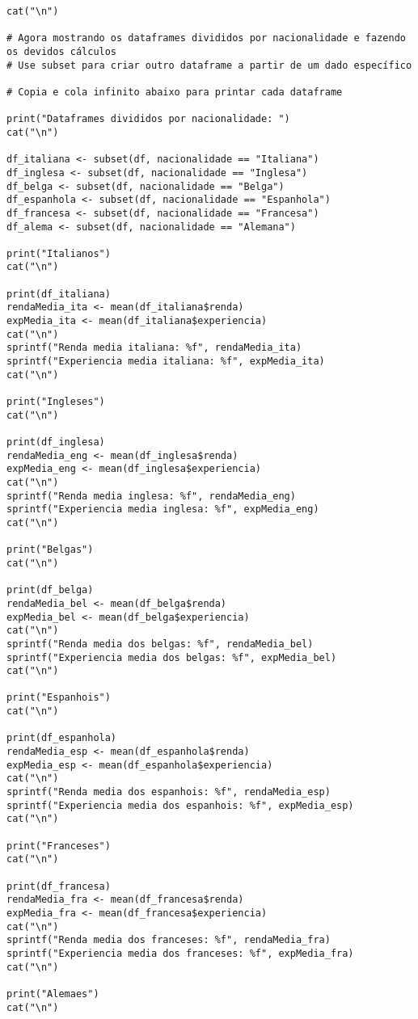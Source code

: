 \documentclass[a4paper,11pt]{article}
\begin{document}
\begin{lstlisting}
cat("\n")

# Agora mostrando os dataframes divididos por nacionalidade e fazendo os devidos cálculos
# Use subset para criar outro dataframe a partir de um dado específico

# Copia e cola infinito abaixo para printar cada dataframe

print("Dataframes divididos por nacionalidade: ")
cat("\n")

df_italiana <- subset(df, nacionalidade == "Italiana")
df_inglesa <- subset(df, nacionalidade == "Inglesa")
df_belga <- subset(df, nacionalidade == "Belga")
df_espanhola <- subset(df, nacionalidade == "Espanhola")
df_francesa <- subset(df, nacionalidade == "Francesa")
df_alema <- subset(df, nacionalidade == "Alemana")

print("Italianos")
cat("\n")

print(df_italiana)
rendaMedia_ita <- mean(df_italiana$renda)
expMedia_ita <- mean(df_italiana$experiencia)
cat("\n")
sprintf("Renda media italiana: %f", rendaMedia_ita)
sprintf("Experiencia media italiana: %f", expMedia_ita)
cat("\n")

print("Ingleses")
cat("\n")

print(df_inglesa)
rendaMedia_eng <- mean(df_inglesa$renda)
expMedia_eng <- mean(df_inglesa$experiencia)
cat("\n")
sprintf("Renda media inglesa: %f", rendaMedia_eng)
sprintf("Experiencia media inglesa: %f", expMedia_eng)
cat("\n")

print("Belgas")
cat("\n")

print(df_belga)
rendaMedia_bel <- mean(df_belga$renda)
expMedia_bel <- mean(df_belga$experiencia)
cat("\n")
sprintf("Renda media dos belgas: %f", rendaMedia_bel)
sprintf("Experiencia media dos belgas: %f", expMedia_bel)
cat("\n")

print("Espanhois")
cat("\n")

print(df_espanhola)
rendaMedia_esp <- mean(df_espanhola$renda)
expMedia_esp <- mean(df_espanhola$experiencia)
cat("\n")
sprintf("Renda media dos espanhois: %f", rendaMedia_esp)
sprintf("Experiencia media dos espanhois: %f", expMedia_esp)
cat("\n")

print("Franceses")
cat("\n")

print(df_francesa)
rendaMedia_fra <- mean(df_francesa$renda)
expMedia_fra <- mean(df_francesa$experiencia)
cat("\n")
sprintf("Renda media dos franceses: %f", rendaMedia_fra)
sprintf("Experiencia media dos franceses: %f", expMedia_fra)
cat("\n")

print("Alemaes")
cat("\n")


\end{lstlisting}
\end{document}
